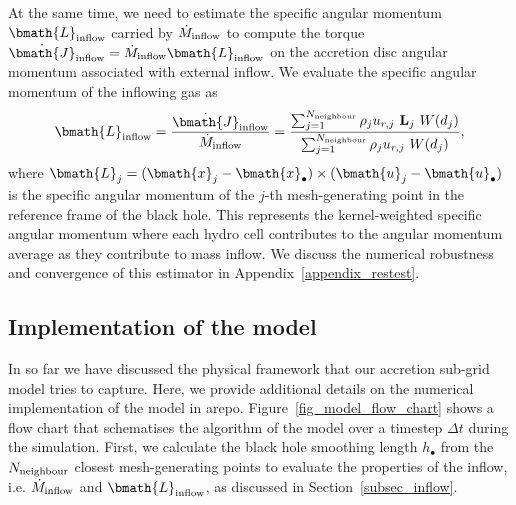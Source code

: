 \documentclass[a4paper,fleqn,usenatbib]{mnras}
\begin{document}
At the same time, we need to estimate the specific angular momentum $\bmath{L}_{\rm inflow}$ carried by $\dot{M}_{\rm inflow}$ to compute the torque $\dot{\bmath{J}}_{\rm inflow} = \dot{M}_{\rm inflow} \bmath{L}_{\rm inflow}$ on the accretion disc angular momentum associated with external inflow.
We evaluate the specific angular momentum of the inflowing gas as
\begin{equation} \label{eq_L_inflow_SPH}
\bmath{L}_{\rm inflow} = \frac{\dot{\bmath{J}}_{\rm inflow}}{\dot{M}_{\rm inflow}} = \frac{\sum_{j=1}^{N_{\rm neighbour}} \rho_{j} u_{r,j}~\mathbf{L}_{j}~W(d_j)}{\sum_{j=1}^{N_{\rm neighbour}} \rho_{j} u_{r,j}~W(d_j)},
\end{equation}
where $\bmath{L}_{j} = (\bmath{x}_{j} - \bmath{x}_{\bullet}) \times (\bmath{u}_{j} - \bmath{u}_{\bullet})$ is the specific angular momentum of the $j$-th mesh-generating point in the reference frame of the black hole.
This represents the kernel-weighted specific angular momentum where each hydro cell contributes to the angular momentum average as they contribute to mass inflow.
We discuss the numerical robustness and convergence of this estimator in Appendix~\ref{appendix_restest}.


\subsection{Implementation of the model} \label{subsec_implem}

In so far we have discussed the physical framework that our accretion sub-grid model tries to capture.
Here, we provide additional details on the numerical implementation of the model in {\sc arepo}.
Figure~\ref{fig_model_flow_chart} shows a flow chart that schematises the algorithm of the model over a timestep $\Delta t$ during the simulation.
First, we calculate the black hole smoothing length $h_{\bullet}$ from the $N_{\rm neighbour}$ closest mesh-generating points to evaluate the properties of the inflow, i.e. $\dot{M}_{\rm inflow}$ and $\bmath{L}_{\rm inflow}$, as discussed in Section~\ref{subsec_inflow}.
\end{document}
